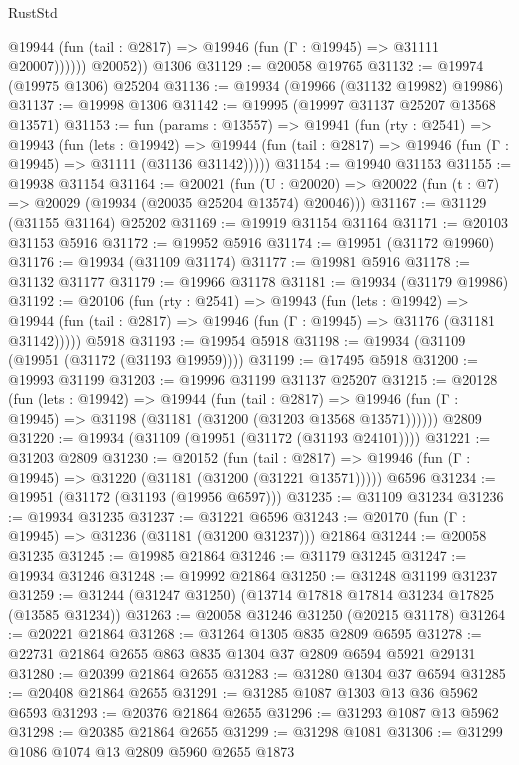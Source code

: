 \begin{lexlean}{RustStd}
\begin{coremodule}
              @19944 (fun (tail : @2817) => @19946 (fun (Γ : @19945) => @31111 @20007))))))
        @20052))
    @1306
@31129 := @20058 @19765
@31132 := @19974 (@19975 @1306) @25204
@31136 := @19934 (@19966 (@31132 @19982) @19986)
@31137 := @19998 @1306
@31142 := @19995 (@19997 @31137 @25207 @13568 @13571)
@31153 := fun (params : @13557) =>
  @19941
    (fun (rty : @2541) =>
    @19943
      (fun (lets : @19942) =>
      @19944 (fun (tail : @2817) => @19946 (fun (Γ : @19945) => @31111 (@31136 @31142)))))
@31154 := @19940 @31153
@31155 := @19938 @31154
@31164 := @20021
    (fun (U : @20020) => @20022 (fun (t : @7) => @20029 (@19934 (@20035 @25204 @13574) @20046)))
@31167 := @31129 (@31155 @31164) @25202
@31169 := @19919 @31154 @31164
@31171 := @20103 @31153 @5916
@31172 := @19952 @5916
@31174 := @19951 (@31172 @19960)
@31176 := @19934 (@31109 @31174)
@31177 := @19981 @5916
@31178 := @31132 @31177
@31179 := @19966 @31178
@31181 := @19934 (@31179 @19986)
@31192 := @20106
    (fun (rty : @2541) =>
    @19943
      (fun (lets : @19942) =>
      @19944 (fun (tail : @2817) => @19946 (fun (Γ : @19945) => @31176 (@31181 @31142)))))
    @5918
@31193 := @19954 @5918
@31198 := @19934 (@31109 (@19951 (@31172 (@31193 @19959))))
@31199 := @17495 @5918
@31200 := @19993 @31199
@31203 := @19996 @31199 @31137 @25207
@31215 := @20128
    (fun (lets : @19942) =>
    @19944
      (fun (tail : @2817) =>
      @19946 (fun (Γ : @19945) => @31198 (@31181 (@31200 (@31203 @13568 @13571))))))
    @2809
@31220 := @19934 (@31109 (@19951 (@31172 (@31193 @24101))))
@31221 := @31203 @2809
@31230 := @20152
    (fun (tail : @2817) => @19946 (fun (Γ : @19945) => @31220 (@31181 (@31200 (@31221 @13571)))))
    @6596
@31234 := @19951 (@31172 (@31193 (@19956 @6597)))
@31235 := @31109 @31234
@31236 := @19934 @31235
@31237 := @31221 @6596
@31243 := @20170 (fun (Γ : @19945) => @31236 (@31181 (@31200 @31237))) @21864
@31244 := @20058 @31235
@31245 := @19985 @21864
@31246 := @31179 @31245
@31247 := @19934 @31246
@31248 := @19992 @21864
@31250 := @31248 @31199 @31237
@31259 := @31244 (@31247 @31250) (@13714 @17818 @17814 @31234 @17825 (@13585 @31234))
@31263 := @20058 @31246 @31250 (@20215 @31178)
@31264 := @20221 @21864
@31268 := @31264 @1305 @835 @2809 @6595
@31278 := @22731 @21864 @2655 @863 @835 @1304 @37 @2809 @6594 @5921 @29131
@31280 := @20399 @21864 @2655
@31283 := @31280 @1304 @37 @6594
@31285 := @20408 @21864 @2655
@31291 := @31285 @1087 @1303 @13 @36 @5962 @6593
@31293 := @20376 @21864 @2655
@31296 := @31293 @1087 @13 @5962
@31298 := @20385 @21864 @2655
@31299 := @31298 @1081
@31306 := @31299 @1086 @1074 @13 @2809 @5960 @2655 @1873

\end{coremodule}
\end{lexlean}
